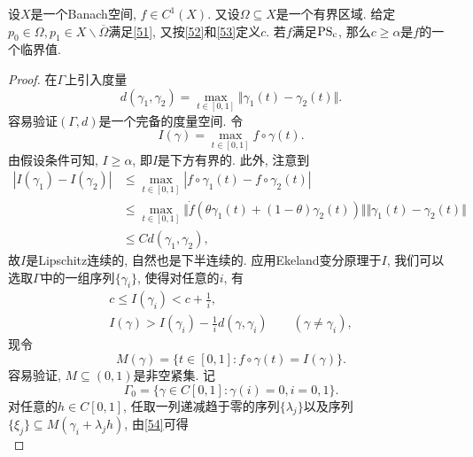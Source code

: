 \begin{theorem}[山路定理]
    设$X$是一个Banach空间, $f \in C^1(X)$. 又设$\Omega \subseteq X$是一个有界区域.
    给定$p_0 \in \Omega, p_1 \in X \smallsetminus \overline{\Omega}$满足\eqref{51}, 又按\eqref{52}和\eqref{53}定义$c$.
    若$f$满足${\rm PS_c}$, 那么$c \geq \alpha$是$f$的一个临界值.
    \begin{proof}
        在$\Gamma$上引入度量 
        \begin{equation*}
            d(\gamma_1, \gamma_2) = \max_{t \in [0, 1]}\Vert \gamma_1(t) - \gamma_2(t)\Vert.
        \end{equation*}
        容易验证$(\Gamma, d)$是一个完备的度量空间. 令 
        \begin{equation*}
            I(\gamma) = \max_{t \in [0, 1]}f \circ \gamma(t).
        \end{equation*}
        由假设条件可知, $I \geq \alpha$, 即$I$是下方有界的. 此外, 注意到 
        \begin{align*}
            |I(\gamma_1) - I(\gamma_2)| &\leq \max_{t \in [0, 1]}|f \circ \gamma_1(t) - f \circ \gamma_2(t)| \\ 
            &\leq \max_{t \in [0, 1]}\Vert \dot f(\theta\gamma_1(t) + (1 - \theta)\gamma_2(t))\Vert \Vert \gamma_1(t) - \gamma_2(t)\Vert \\ 
            &\leq Cd(\gamma_1, \gamma_2),
        \end{align*}
        故$I$是Lipschitz连续的, 自然也是下半连续的. 应用Ekeland变分原理于$I$, 我们可以选取$\Gamma$中的一组序列$\{\gamma_i\}$, 使得对任意的$i$, 有 
        \begin{gather}
            c \leq I(\gamma_i) < c + \frac{1}{i}, \label{54} \\ 
            I(\gamma) > I(\gamma_i) - \frac{1}{i}d(\gamma, \gamma_i) \qquad (\gamma \neq \gamma_i) \label{55},
        \end{gather}
        现令 
        \begin{equation*}
            M(\gamma) = \{t \in [0, 1]\colon f \circ \gamma(t) = I(\gamma)\}.
        \end{equation*}
        容易验证, $M \subseteq (0, 1)$是非空紧集. 记
        \begin{equation*}
            \Gamma_0 = \{\gamma \in C[0, 1]\colon \gamma(i) = 0, i = 0, 1\}.
        \end{equation*}
        对任意的$h \in C[0, 1]$, 任取一列递减趋于零的序列$\{\lambda_j\}$以及序列$\{\xi_j\} \subseteq M(\gamma_i + \lambda_jh)$, 由\eqref{54}可得 
        \begin{equation*}

\end{equation*}
\end{proof}
\end{theorem}
